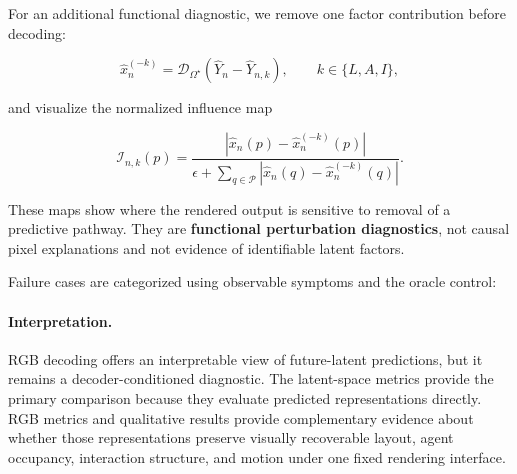 For an additional functional diagnostic, we remove one factor
contribution before decoding:

\begin{equation*}
\widehat x_n^{(-k)}
=
\mathcal D_{\Omega^\star}
\left(
\widehat Y_n-\widehat Y_{n,k}
\right),
\qquad
k\in\{L,A,I\},
\end{equation*}

and visualize the normalized influence map

\begin{equation*}
\mathcal I_{n,k}(p)
=
\frac{
\left|
\widehat x_n(p)-\widehat x_n^{(-k)}(p)
\right|
}{
\epsilon+
\sum_{q\in\mathcal P}
\left|
\widehat x_n(q)-\widehat x_n^{(-k)}(q)
\right|
}.
\end{equation*}

These maps show where the rendered output is sensitive to removal of a
predictive pathway. They are \textbf{functional perturbation
diagnostics}, not causal pixel explanations and not evidence of
identifiable latent factors.

Failure cases are categorized using observable symptoms and the oracle
control:





\paragraph{Interpretation.}
RGB decoding offers an interpretable view of future-latent predictions,
but it remains a decoder-conditioned diagnostic. The latent-space
metrics provide the primary comparison because they evaluate predicted
representations directly. RGB metrics and qualitative results provide
complementary evidence about whether those representations preserve
visually recoverable layout, agent occupancy, interaction structure,
and motion under one fixed rendering interface.